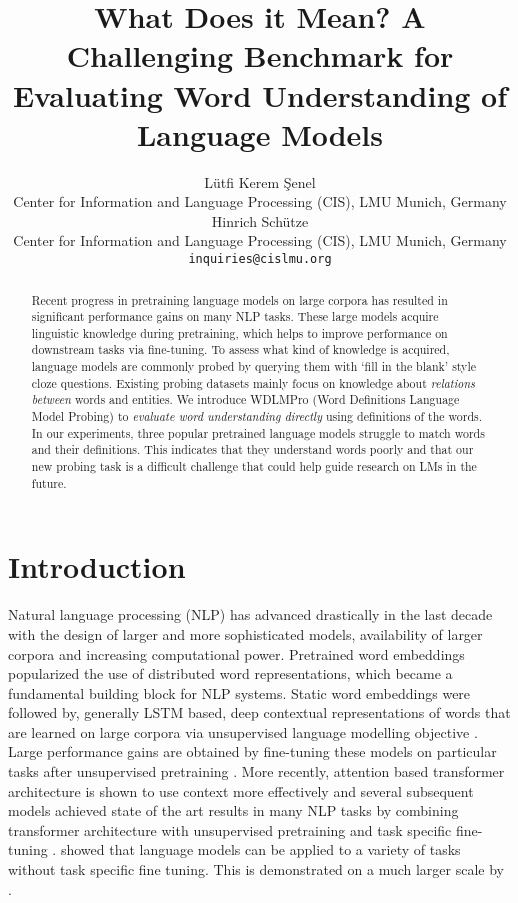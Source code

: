 \documentclass[11pt,a4paper]{article}
\title{What Does it Mean? A Challenging Benchmark for Evaluating Word Understanding of Language Models}
\author{Lütfi Kerem Şenel \\
  Center for Information and Language Processing (CIS), LMU Munich, Germany \\
  Hinrich Schütze \\
    Center for Information and Language Processing (CIS), LMU Munich, Germany \\
  \texttt{inquiries@cislmu.org} \\
  }
\date{}
\begin{document}
\maketitle
\begin{abstract}

Recent progress in pretraining language models on large
corpora has resulted in significant performance gains on many NLP
tasks. These large models acquire linguistic knowledge
during pretraining, which helps to improve
performance on downstream tasks via fine-tuning. To assess
what kind of knowledge is acquired,
language models are commonly probed by querying them with
`fill in the blank' style cloze questions. Existing probing
datasets mainly focus on knowledge about \emph{relations between}
words and entities. We introduce WDLMPro (Word Definitions
Language Model Probing) to \emph{evaluate word understanding directly} using definitions of
the words. In our experiments, three popular pretrained
language models
struggle to match words and their  definitions. This
indicates that they understand words poorly and that
our new probing task is a difficult challenge that could
help guide research on LMs in the future.
\end{abstract}



\section{Introduction}

Natural language processing (NLP)  has advanced drastically
in the last decade with the design of larger and more
sophisticated models, availability of larger
corpora and increasing computational
power. Pretrained word embeddings
\cite{mikolov13word2vec_b, pennington14glove} popularized
the use of distributed word representations, which became a
fundamental building block for NLP systems. Static word
embeddings were followed by, generally LSTM based, deep
contextual representations of words that are learned on
large corpora via unsupervised language modelling objective
\cite{peters18ELMO}. Large performance gains are obtained
by fine-tuning these models on particular tasks after
unsupervised pretraining \cite{radford18fineTuning,
  howard18ULMFiT}. More recently, attention based
transformer architecture is shown to use context more
effectively \cite{vaswani17transformers} and several
subsequent models achieved state of the art results in many
NLP tasks by combining transformer architecture with
unsupervised pretraining and task specific fine-tuning
\cite{devlin19BERT, liu19RoBERTa}. 
showed that language models can be applied to a variety of
tasks without task specific fine tuning. This is demonstrated on a much larger scale by . 
\end{document}
